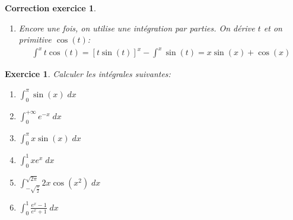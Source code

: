 \documentclass[12pt]{article}
\newtheorem{exercice}{\bf Exercice}
\newtheorem{correction}{\bf Correction exercice}
\newenvironment{exo}{
\begin{exercice}\smallskip\normalfont}{\end{exercice}
}
\newenvironment{cor}{
\begin{correction}\smallskip\normalfont}{\end{correction}
}
\begin{document}
\begin{cor}
\begin{enumerate}
\item Encore une fois, on utilise une int\'egration par parties.
  On d\'erive $t$ et on primitive $\cos(t)$:
  \begin{align*}
    \int^x t \cos(t) = [t\sin(t)]^x - \int^x \sin(t)
    = x \sin(x) + \cos(x)
  \end{align*}
\end{enumerate}
\end{cor}
\color{black}
\fi




\begin{exo} Calculer les int\'egrales suivantes:
\begin{multicols}{3}
\begin{enumerate}
\item $\int_0^{\pi} \sin(x) \;dx$
\item $\int_0^{+\infty} e^{-x} \;dx$
\item $\int_0^{\pi} x \sin(x) \;dx$
\item $\int_0^1 x e^x \;dx$
\item $\int_{- \sqrt{\frac{\pi}{2}}}^{\sqrt{2\pi}} 2x \cos(x^2) \;dx$
\item $\int_{0}^1 \frac{e^x - 1}{e^x + 1} \;dx$
\end{enumerate}
\end{multicols}
\end{exo}
\end{document}

